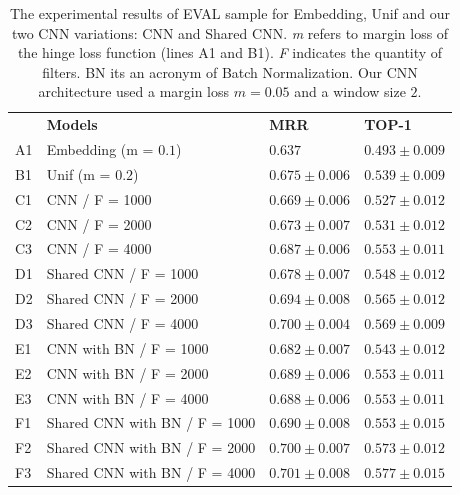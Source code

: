 \documentclass[sigconf]{acmart}
\begin{document}
\begin{table}[t]
\centering
\begin{tabular}{ p{1cm} p{6cm} >{\raggedleft\arraybackslash}p{4cm} >{\raggedleft\arraybackslash}p{4cm} }
 \hline
    & & \multicolumn{2}{c}{\textbf{Results}}\\
 \hline
 & \textbf{Models} & \textbf{MRR} & \textbf{TOP-1}\\
 \hline
 A1 & Embedding (m = $0.1$) & $0.637$& $0.493 \pm 0.009$\\
 
 \hline
 
 B1 & Unif (m = $0.2$) & $0.675 \pm 0.006$ & $0.539 \pm 0.009$\\
 
 \hline
 
 C1 & CNN / F = 1000 & $0.669 \pm 0.006$ & $0.527 \pm 0.012$\\
 
 C2 & CNN / F = 2000 & $0.673 \pm 0.007$ & $0.531 \pm 0.012$\\
 
 C3 & CNN / F = 4000 & $0.687 \pm 0.006$ & $0.553 \pm 0.011$\\
 
 \hline
 
 D1 & Shared CNN / F = 1000 & $0.678 \pm 0.007$ & $0.548 \pm 0.012$\\
 
 D2 & Shared CNN / F = 2000 & $0.694 \pm 0.008$ & $0.565 \pm 0.012$\\
 
 D3 & Shared CNN / F = 4000 & $0.700 \pm 0.004$ & $0.569 \pm 0.009$\\
 
 \hline
 
 E1 & CNN with BN / F = 1000 & $0.682 \pm 0.007$ & $0.543 \pm 0.012$\\
 
 E2 & CNN with BN / F = 2000 & $0.689 \pm 0.006$ & $0.553 \pm 0.011$\\
 
 E3 & CNN with BN / F = 4000 & $0.688 \pm 0.006$ & $0.553 \pm 0.011$\\
 
 \hline
 
 F1 & Shared CNN with BN / F = 1000 & $0.690 \pm 0.008$ & $0.553 \pm 0.015$\\
 
 F2 & Shared CNN with BN / F = 2000 & $0.700 \pm 0.007$ & $0.573 \pm 0.012$\\
 
 F3 & Shared CNN with BN / F = 4000 & $0.701 \pm 0.008$ & $0.577 \pm 0.015$\\
 
\hline
\end{tabular}
\caption{The experimental results of EVAL sample for Embedding, Unif and our two CNN variations: CNN and Shared CNN. \emph{m} refers to margin loss of the hinge loss function (lines A1 and B1). \emph{F} indicates the quantity of filters. BN its an acronym of Batch Normalization. Our CNN architecture used a margin loss $m = 0.05$ and a window size $2$.}
\label{table:resultados}
\end{table}
\end{document}
